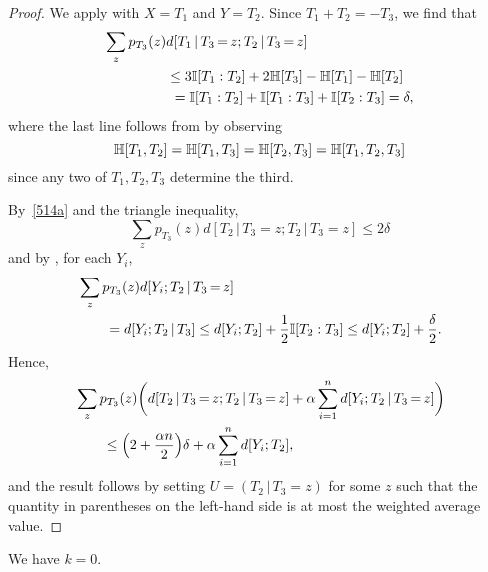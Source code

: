 \begin{proof}
  We apply  with $X=T_1$ and $Y=T_2$.
  Since $T_1+T_2=-T_3$, we find that
  \begin{align}\nonumber
    \sum_{z} p_{T_3}(z) & d[T_1 \,|\, T_3 \mathop{=} z;T_2 \,|\, T_3 \mathop{=} z] \\ \nonumber
    &\leq  3 \mathbb{I}[T_1 : T_2] + 2 \mathbb{H}[T_3] - \mathbb{H}[T_1] - \mathbb{H}[T_2] \\
    &\ = \mathbb{I}[T_1 : T_2] + \mathbb{I}[T_1 : T_3] + \mathbb{I}[T_2 : T_3]
    = \delta,\label{514a}
  \end{align}
  where the last line follows from  by observing
  \[
    \mathbb{H}[T_1,T_2] = \mathbb{H}[T_1,T_3] = \mathbb{H}[T_2,T_3] = \mathbb{H}[T_1,T_2,T_3]
  \]
  since any two of $T_1,T_2,T_3$ determine the third.

  By~\eqref{514a} and the triangle inequality,
  \[
    \sum_z p_{T_3}(z) d[T_2 \,|\, T_3 \mathop{=} z; T_2 \,|\, T_3\mathop{=}z] \leq 2 \delta
  \]
  and by , for each $Y_i$,
  \begin{align*}
    &\sum_z p_{T_3}(z) d[Y_i; T_2 \,|\, T_3 \mathop{=} z] \\
    &\qquad= d[Y_i; T_2 \,|\, T_3]
                                    \leq d[Y_i;T_2] + \frac12 \mathbb{I}[T_2 : T_3]
                                    \leq d[Y_i;T_2] + \frac{\delta}{2}.
  \end{align*}
  Hence,
  \begin{align*}
    &\sum_z p_{T_3}(z) \bigg( d[T_2 \,|\, T_3 \mathop{=} z; T_2 \,|\, T_3 \mathop{=} z] + \alpha \sum_{i=1}^n d[Y_i;T_2 \,|\, T_3 \mathop{=} z] \bigg) \\
    &\qquad \leq
    \Bigl(2 + \frac{\alpha n}{2} \Bigr) \delta + \alpha \sum_{i=1}^n d[Y_i; T_2],
  \end{align*}
  and the result follows by setting $U=(T_2 \,|\, T_3 \mathop{=} z)$ for some $z$ such that the quantity in parentheses on the left-hand side is at most the weighted average value.
\end{proof}

\begin{proposition}\label{k-vanish}  We have $k = 0$.
\end{proposition}


